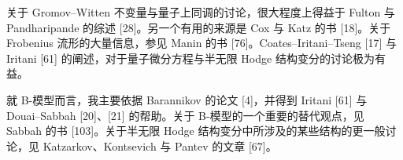 关于 Gromov--Witten 不变量与量子上同调的讨论，很大程度上得益于 Fulton 与 Pandharipande 的综述 [28]。另一个有用的来源是 Cox 与 Katz 的书 [18]。关于 Frobenius 流形的大量信息，参见 Manin 的书 [76]。Coates--Iritani--Tseng [17] 与 Iritani [61] 的阐述，对于量子微分方程与半无限 Hodge 结构变分的讨论极为有益。

就 B-模型而言，我主要依据 Barannikov 的论文 [4]，并得到 Iritani [61] 与 Douai--Sabbah [20]、[21] 的帮助。关于 B-模型的一个重要的替代观点，见 Sabbah 的书 [103]。关于半无限 Hodge 结构变分中所涉及的某些结构的更一般讨论，见 Katzarkov、Kontsevich 与 Pantev 的文章 [67]。


